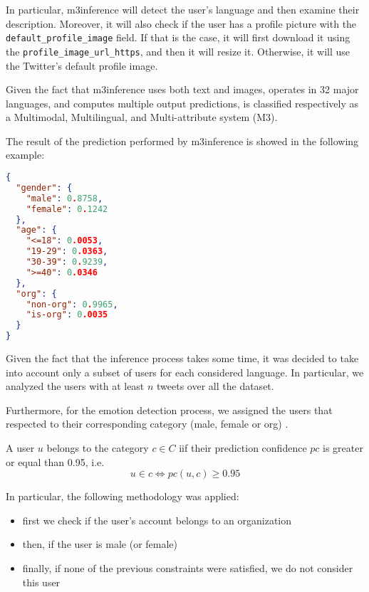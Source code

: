 In particular, m3inference will detect the user's language and then examine their description. Moreover, it will also check if the user has a profile picture with the \texttt{default\_profile\_image} field. If that is the case, it will first download it using the \texttt{profile\_image\_url\_https}, and then it will resize it. Otherwise, it will use the Twitter's default profile image. 

Given the fact that m3inference uses both text and images, operates in 32 major languages, and computes multiple output predictions, is classified respectively as a Multimodal, Multilingual, and Multi-attribute system (M3).

The result of the prediction performed by m3inference is showed in the following example:

\begin{lstlisting}[language=json, caption={Json object returned by m3inference}, captionpos=b, label={lst:m3inference-prediction}]
{
  "gender": {
    "male": 0.8758, 
    "female": 0.1242
  }, 
  "age": {
    "<=18": 0.0053, 
    "19-29": 0.0363, 
    "30-39": 0.9239, 
    ">=40": 0.0346
  }, 
  "org": {
    "non-org": 0.9965, 
    "is-org": 0.0035
  }
}
\end{lstlisting}

Given the fact that the inference process takes some time, it was decided to take into account only a subset of users for each considered language. In particular, we analyzed the users with at least \(n\) tweets over all the dataset. 

Furthermore, for the emotion detection process, we assigned the users that respected  to their corresponding category (male, female or org) .

\begin{definition}
\label{def:valid-users}
	A user \(u\) belongs to the category \(c \in C\) iif their prediction confidence \(pc\) is greater or equal than 0.95, i.e.
	\[u \in c \Longleftrightarrow pc(u, c) \geq 0.95\]
\end{definition}
	
In particular, the following methodology was applied:
	
\begin{itemize}
	\item first we check if the user's account belongs to an organization
	\item then, if the user is male (or female)
	\item finally, if none of the previous constraints were satisfied, we do not consider this user
\end{itemize}

